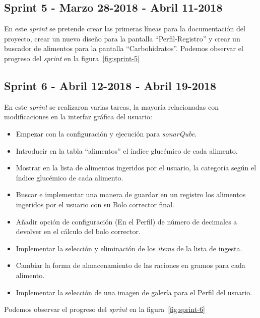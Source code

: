 \subsection{Sprint 5 - Marzo 28-2018 - Abril 11-2018}
En este \textit{sprint} se pretende crear las primeras líneas para la documentación del proyecto, crear un nuevo diseño para la pantalla ``Perfil-Registro'' y crear un buscador de alimentos para la pantalla ``Carbohidratos''.
Podemos observar el progreso del \textit{sprint} en la figura~\ref{fig:sprint-5}
\subsection{Sprint 6 - Abril 12-2018 - Abril 19-2018}
En este \textit{sprint} se realizaron varias tareas, la mayoría relacionadas con modificaciones en la interfaz gráfica del usuario:
\begin{itemize}
	\item Empezar con la configuración y ejecución para \textit{sonarQube}.
	\item Introducir en la tabla ``alimentos'' el índice glucémico de cada alimento.
	\item Mostrar en la lista de alimentos ingeridos por el usuario, la categoría según el índice glucémico de cada alimento.
	\item Buscar e implementar una manera de guardar en un registro los alimentos ingeridos por el usuario con su Bolo corrector final.
	\item Añadir opción de configuración (En el Perfil) de número de decimales a devolver en el cálculo del bolo corrector.
	\item Implementar la selección y eliminación de los \textit{items} de la lista de ingesta.
	\item Cambiar la forma de almacenamiento de las raciones en gramos para cada alimento.
	\item Implementar la selección de una imagen de galería para el Perfil del usuario.
\end{itemize}
Podemos observar el progreso del \textit{sprint} en la figura~\ref{fig:sprint-6}
